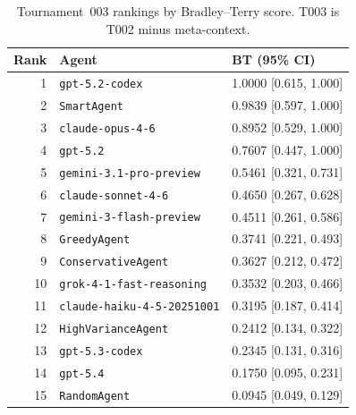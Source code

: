 \documentclass[11pt]{article}
\newcommand{\tTwo}{T002}
\newcommand{\tThree}{T003}
\begin{document}
\begin{table}[t]
\centering
\small
\caption{Tournament~003 rankings by Bradley--Terry score. \tThree{} is \tTwo{} minus meta-context.}
\label{tab:t3_rank}
\begin{tabular}{rll}
\toprule
Rank & Agent & BT (95\% CI) \\
\midrule
1 & \texttt{gpt-5.2-codex} & 1.0000 [0.615, 1.000] \\
2 & \texttt{SmartAgent} & 0.9839 [0.597, 1.000] \\
3 & \texttt{claude-opus-4-6} & 0.8952 [0.529, 1.000] \\
4 & \texttt{gpt-5.2} & 0.7607 [0.447, 1.000] \\
5 & \texttt{gemini-3.1-pro-preview} & 0.5461 [0.321, 0.731] \\
6 & \texttt{claude-sonnet-4-6} & 0.4650 [0.267, 0.628] \\
7 & \texttt{gemini-3-flash-preview} & 0.4511 [0.261, 0.586] \\
8 & \texttt{GreedyAgent} & 0.3741 [0.221, 0.493] \\
9 & \texttt{ConservativeAgent} & 0.3627 [0.212, 0.472] \\
10 & \texttt{grok-4-1-fast-reasoning} & 0.3532 [0.203, 0.466] \\
11 & \texttt{claude-haiku-4-5-20251001} & 0.3195 [0.187, 0.414] \\
12 & \texttt{HighVarianceAgent} & 0.2412 [0.134, 0.322] \\
13 & \texttt{gpt-5.3-codex} & 0.2345 [0.131, 0.316] \\
14 & \texttt{gpt-5.4} & 0.1750 [0.095, 0.231] \\
15 & \texttt{RandomAgent} & 0.0945 [0.049, 0.129] \\
\bottomrule
\end{tabular}
\end{table}
\end{document}
